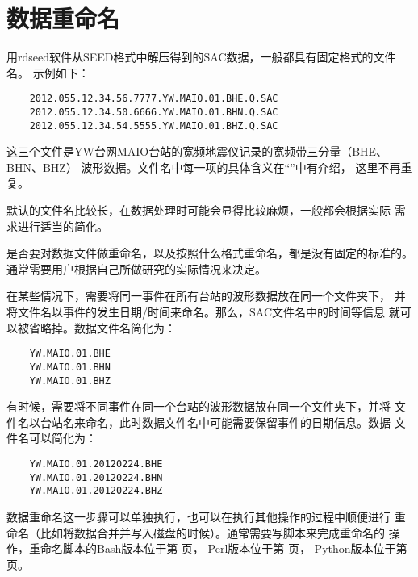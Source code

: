 \section{数据重命名}
用rdseed软件从SEED格式中解压得到的SAC数据，一般都具有固定格式的文件名。
示例如下：
\begin{verbatim}
    2012.055.12.34.56.7777.YW.MAIO.01.BHE.Q.SAC
    2012.055.12.34.50.6666.YW.MAIO.01.BHN.Q.SAC
    2012.055.12.34.54.5555.YW.MAIO.01.BHZ.Q.SAC
\end{verbatim}
这三个文件是YW台网MAIO台站的宽频地震仪记录的宽频带三分量（BHE、BHN、BHZ）
波形数据。文件名中每一项的具体含义在``''中有介绍，
这里不再重复。

默认的文件名比较长，在数据处理时可能会显得比较麻烦，一般都会根据实际
需求进行适当的简化。

是否要对数据文件做重命名，以及按照什么格式重命名，都是没有固定的标准的。
通常需要用户根据自己所做研究的实际情况来决定。

在某些情况下，需要将同一事件在所有台站的波形数据放在同一个文件夹下，
并将文件名以事件的发生日期/时间来命名。那么，SAC文件名中的时间等信息
就可以被省略掉。数据文件名简化为：
\begin{verbatim}
    YW.MAIO.01.BHE
    YW.MAIO.01.BHN
    YW.MAIO.01.BHZ
\end{verbatim}

有时候，需要将不同事件在同一个台站的波形数据放在同一个文件夹下，并将
文件名以台站名来命名，此时数据文件名中可能需要保留事件的日期信息。数据
文件名可以简化为：
\begin{verbatim}
    YW.MAIO.01.20120224.BHE
    YW.MAIO.01.20120224.BHN
    YW.MAIO.01.20120224.BHZ
\end{verbatim}

数据重命名这一步骤可以单独执行，也可以在执行其他操作的过程中顺便进行
重命名（比如将数据合并并写入磁盘的时候）。通常需要写脚本来完成重命名的
操作，重命名脚本的Bash版本位于第 \pageref{subsec:rename-in-bash} 页，
Perl版本位于第 \pageref{subsec:rename-in-perl} 页，
Python版本位于第 \pageref{subsec:rename-in-python} 页。

